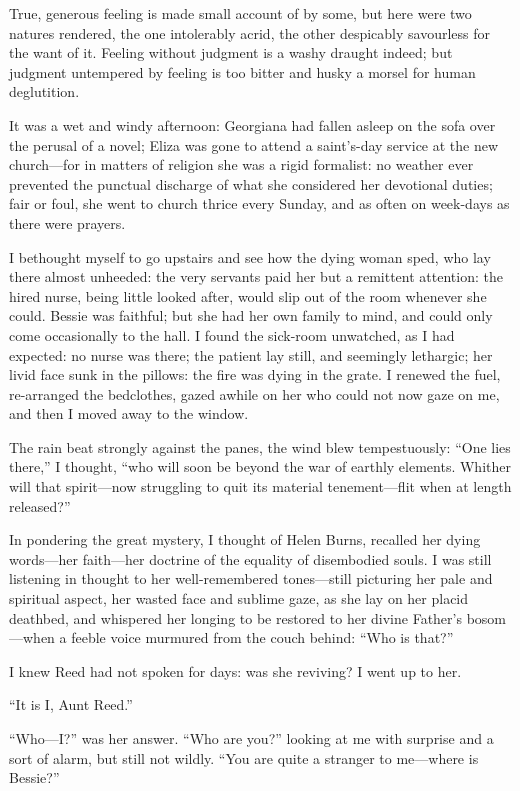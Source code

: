 True, generous feeling is made small account of by some, but here were
two natures rendered, the one intolerably acrid, the other despicably
savourless for the want of it. Feeling without judgment is a washy
draught indeed; but judgment untempered by feeling is too bitter and
husky a morsel for human deglutition.

It was a wet and windy afternoon: Georgiana had fallen asleep on the
sofa over the perusal of a novel; Eliza was gone to attend a saint's-day
service at the new church---for in matters of religion she was a rigid
formalist: no weather ever prevented the punctual discharge of what she
considered her devotional duties; fair or foul, she went to church
thrice every Sunday, and as often on week-days as there were prayers.

I bethought myself to go upstairs and see how the dying woman sped, who
lay there almost unheeded: the very servants paid her but a remittent
attention: the hired nurse, being little looked after, would slip out of
the room whenever she could. Bessie was faithful; but she had her own
family to mind, and could only come occasionally to the hall. I found
the sick-room unwatched, as I had expected: no nurse was there; the
patient lay still, and seemingly lethargic; her livid face sunk in the
pillows: the fire was dying in the grate. I renewed the fuel,
re-arranged the bedclothes, gazed awhile on her who could not now gaze
on me, and then I moved away to the window.

The rain beat strongly against the panes, the wind blew tempestuously:
\enquote{One lies there,} I thought, \enquote{who will soon be beyond
	the war of earthly elements. Whither will that spirit---now struggling
	to quit its material tenement---flit when at length released?}

In pondering the great mystery, I thought of Helen Burns, recalled her
dying words---her faith---her doctrine of the equality of disembodied
souls. I was still listening in thought to her well-remembered
tones---still picturing her pale and spiritual aspect, her wasted face
and sublime gaze, as she lay on her placid deathbed, and whispered her
longing to be restored to her divine Father's bosom---when a feeble
voice murmured from the couch behind: \enquote{Who is that?}

I knew \Mrs{} Reed had not spoken for days: was she reviving? I went up
to her.

\enquote{It is I, Aunt Reed.}

\enquote{Who---I?} was her answer. \enquote{Who are you?} looking at me
with surprise and a sort of alarm, but still not wildly. \enquote{You
	are quite a stranger to me---where is Bessie?}

